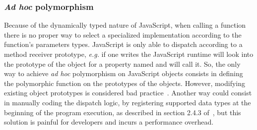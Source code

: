 \documentclass[american,english,runningheads]{llncs}
\newcommand{\eg}{\emph{e.g.}}
\begin{document}
% 
% 
% 
% 
% 
% 

\subsubsection{\emph{Ad hoc} polymorphism}

Because of the dynamically typed nature of JavaScript, when calling a function there is no proper way to select a
specialized implementation according to the function’s parameters types. JavaScript is only able to dispatch
according to a method receiver prototype, \eg{} if one writes  the JavaScript runtime will look into
the prototype of the  object for a property named  and will call it. So, the only way to achieve
\emph{ad hoc} polymorphism on JavaScript objects consists in defining the polymorphic function on the prototypes of
the objects. However, modifying existing object prototypes is considered bad
practice~\cite{Zakas12_MaintainableJs}. Another way could consist in manually coding the dispatch logic, by
registering supported data types at the beginning of the program execution, as described in section 2.4.3
of~\cite{Abelson83_SICP}, but this solution is painful for developers and incurs a performance overhead.
\end{document}
